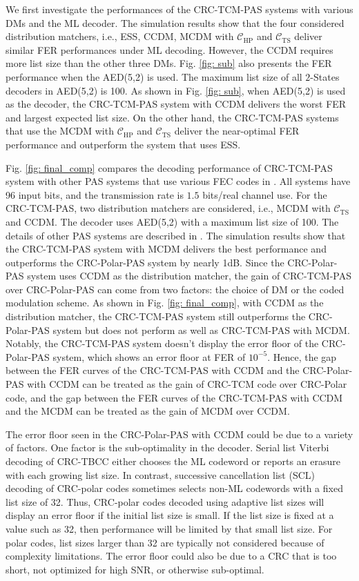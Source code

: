\documentclass [PhD] {uclathes}
\begin{document}
We first investigate the performances of the CRC-TCM-PAS systems with various DMs and the ML decoder. The simulation results show that the four considered distribution matchers, i.e., ESS, CCDM, MCDM with $\mathcal{C}_{\text{HP}}$ and $\mathcal{C}_{\text{TS}}$  deliver similar FER performances under ML decoding. However, the CCDM requires more list size than the other three DMs. Fig. \ref{fig: sub} also presents the FER performance when the AED(5,2) is used. The maximum list size of all $2$-States decoders in AED(5,2) is 100. As shown in Fig. \ref{fig: sub}, when AED(5,2) is used as the decoder, the CRC-TCM-PAS system with CCDM delivers the worst FER and largest expected list size. On the other hand, the  CRC-TCM-PAS systems that use the MCDM with $\mathcal{C}_{\mathrm{HP}}$ and $\mathcal{C}_{\mathrm{TS}}$ deliver the near-optimal FER performance and outperform the system that uses ESS.

Fig. \ref{fig: final_comp} compares the decoding performance of CRC-TCM-PAS system with other PAS systems that use various FEC codes in \cite[Fig.14]{cocskun2019efficient}. All systems have 96 input bits, and the transmission rate is $1.5$ bits/real channel use. 
For the CRC-TCM-PAS, two distribution matchers are considered, i.e., MCDM with $\mathcal{C}_{\mathrm{TS}}$ and CCDM. The decoder uses AED(5,2) with a maximum list size of 100.
The details of  other PAS systems are described in   \cite{cocskun2019efficient}. The simulation results show that the CRC-TCM-PAS system with MCDM delivers the best performance and outperforms the CRC-Polar-PAS system by nearly 1dB.  Since the CRC-Polar-PAS system uses CCDM as the distribution matcher, the gain of CRC-TCM-PAS over CRC-Polar-PAS can come from two factors: the choice of DM or the coded modulation scheme. As shown in Fig. \ref{fig: final_comp}, with CCDM as the distribution matcher, the CRC-TCM-PAS system still outperforms the CRC-Polar-PAS system but does not perform as well as CRC-TCM-PAS with MCDM. Notably, the CRC-TCM-PAS system doesn't display the error floor of the CRC-Polar-PAS system, which shows an error floor at FER of $10^{-5}$. Hence, the gap between the FER curves of the CRC-TCM-PAS with CCDM and the CRC-Polar-PAS with CCDM can be treated as the gain of CRC-TCM code over CRC-Polar code, and the gap between the FER curves of the CRC-TCM-PAS with CCDM and the MCDM can be treated as the gain of MCDM over CCDM.

The error floor seen in the CRC-Polar-PAS with CCDM could be due to a variety of factors.  One factor is the sub-optimality in the decoder. Serial list Viterbi decoding of CRC-TBCC either chooses the ML codeword or reports an erasure with each growing list size.  In contrast,  successive cancellation list (SCL) decoding of CRC-polar codes sometimes selects non-ML codewords with a fixed list size of 32.
Thus, CRC-polar codes decoded using adaptive list sizes will display an error floor if the initial list size is small.
If the list size is fixed at a value such as 32, then performance will be limited by that small list size.
For polar codes, list sizes larger than 32 are typically not considered because of complexity limitations.
The error floor could also be due to a CRC that is too short, not optimized for high SNR, or otherwise sub-optimal.
\end{document}
